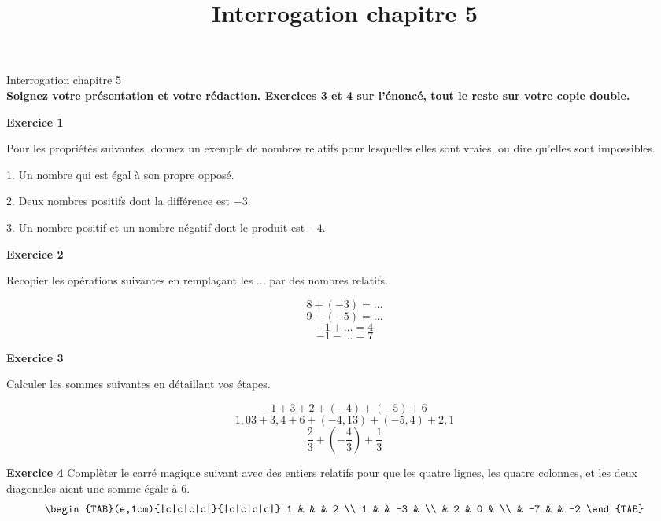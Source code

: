 \documentclass[14pt]{extreport}
\title{Interrogation chapitre 5}
\date{}
\theoremstyle{plain}
\begin{document}
\begin{center}{\Large Interrogation chapitre 5}\\ \textbf{Soignez votre présentation et votre rédaction.
Exercices 3 et 4 sur l'énoncé, tout le reste sur votre copie double.}\end{center}


\textbf{Exercice 1} %

Pour les propriétés suivantes, donnez un exemple de nombres relatifs pour lesquelles elles sont vraies, ou dire qu'elles sont impossibles. 

1. Un nombre qui est égal à son propre opposé.

2. Deux nombres positifs dont la différence est $-3$. 

3. Un nombre positif et un nombre négatif dont le produit est $-4$. 


\textbf{Exercice 2}  %

Recopier les opérations suivantes en remplaçant les $\ldots$ par des nombres relatifs. 

\[ 8 + (-3) =\ldots \]
\[ 9 - (-5) = \ldots \]
\[ -1 + \ldots = 4 \]
\[ -1 - \ldots = 7 \]

\textbf{Exercice 3} %

Calculer les sommes suivantes en détaillant vos étapes. 

\[ -1  + 3 + 2 + (-4) + (-5) + 6 \]
\[ 1,03  + 3,4 + 6 + (-4,13)   + (-5,4) + 2,1  \]
\[ \frac23 +  \left(- \frac43\right) + \frac13\]




\textbf{Exercice 4} %
Complèter le carré magique suivant avec des entiers relatifs pour que les quatre lignes, les quatre colonnes, 
et les deux diagonales aient une somme égale à $6$. 
\[
\begin{TAB}(e,1cm){|c|c|c|c|}{|c|c|c|c|}
    1 & & & 2 \\
    1 &  & -3 &  \\
      & 2 & 0 & \\
      & -7 &  & -2
\end{TAB}
\]

%
\end{document}
